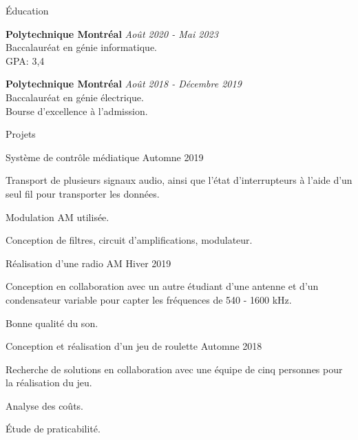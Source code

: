 \documentclass{resume} %
\begin{document}
	
	
	\begin{rSection}{Éducation}
		
		{\bf Polytechnique Montréal} \hfill {\em Août 2020 - Mai 2023} 
		\\ Baccalauréat en génie informatique.
		\\GPA: 3,4
		
		{\bf Polytechnique Montréal} \hfill {\em Août 2018 - Décembre 2019} 
		\\ Baccalauréat en génie électrique.
		\\ \hspace{0.5cm}  Bourse d'excellence à l'admission.
	\end{rSection}
	
	\begin{rSection}{Projets}
		
		\begin{rSubsection}{Système de contrôle médiatique }{Automne 2019}{}{}
			\item   Transport de plusieurs signaux audio, ainsi que l'état d'interrupteurs à l'aide d'un seul fil pour transporter les données.
			\item   Modulation AM utilisée.
			\item Conception de filtres, circuit d'amplifications, modulateur.
			
		\end{rSubsection}
		
		\begin{rSubsection}{Réalisation d'une radio AM }{Hiver 2019}{}{}
			\item   Conception en collaboration avec un autre étudiant d'une antenne et
			d'un condensateur variable pour capter les fréquences de 540 - 1600 kHz.
			\item   Bonne qualité du son.
			
		\end{rSubsection}
		
		\begin{rSubsection}{Conception et réalisation d’un jeu de roulette }{Automne 2018}{}{}
			\item  Recherche de solutions en collaboration avec une équipe de cinq personnes pour la réalisation du jeu.
			\item  Analyse des coûts.
			\item  Étude de praticabilité.
		\end{rSubsection} 
		
	\end{rSection}
	
\end{document}

